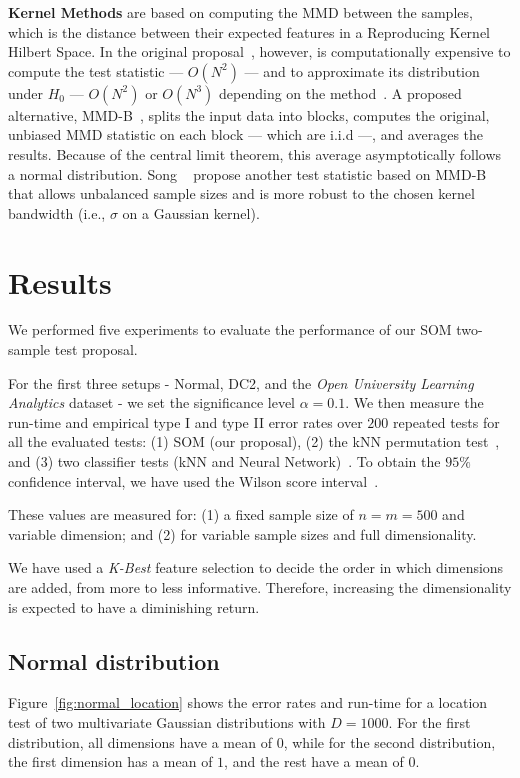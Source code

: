 \textbf{Kernel Methods} are based on computing the \gls{MMD} between the samples,
which is the distance between their expected features in a Reproducing Kernel Hilbert Space.
In the original proposal~\cite{gretton2012kernel}, however, is computationally
expensive to compute the test statistic --- $O(N^2)$ --- and to approximate its distribution under
$H_0$ --- $O(N^2)$ or $O(N^3)$ depending on the method~\cite{zaremba2013b}.
A proposed alternative, MMD-B~\cite{zaremba2013b}, splits the input data into blocks, computes the original,
unbiased \gls{MMD} statistic on each block --- which are i.i.d ---, and averages the results.
Because of the central limit theorem, this average asymptotically follows a normal distribution.
Song \etal~\cite{song2021fast} propose another test statistic based on MMD-B that allows
unbalanced sample sizes and is more robust to the chosen kernel bandwidth (i.e., $\sigma$ on a Gaussian kernel).

\section{Results}
\label{sec:som_results}

We performed five experiments to evaluate the performance of our \gls{SOM} 
two-sample test proposal.

For the first three setups - Normal, DC2, and the \emph{Open University Learning Analytics} dataset
- we set the significance level $\alpha = 0.1$. We then measure the run-time and empirical 
type I and type II error rates over $200$ repeated tests for all the evaluated
tests: (1) \gls{SOM}  (our proposal), (2) the \gls{kNN} permutation test~\cite{Schilling1986b},
and (3) two classifier tests (\gls{kNN} and Neural Network)~\cite{lopez2016revisiting}.
To obtain the $95\%$ confidence interval, we have used the Wilson score interval~\cite{Wilson1927}.

These values are measured for: (1) a fixed sample size of $n = m = 500$ and variable dimension;
and (2) for variable sample sizes and full dimensionality.

We have used a \emph{K-Best} feature selection to decide the order in which dimensions are added, from more to less informative.
Therefore, increasing the dimensionality is expected to have a diminishing return.

\subsection{Normal distribution}
Figure~\ref{fig:normal_location} shows the error rates and run-time for a location
test of two multivariate Gaussian distributions with $D=1000$. For the first 
distribution, all dimensions have a mean of $0$, while for the second distribution,
the first dimension has a mean of $1$, and the rest have a mean of $0$.

